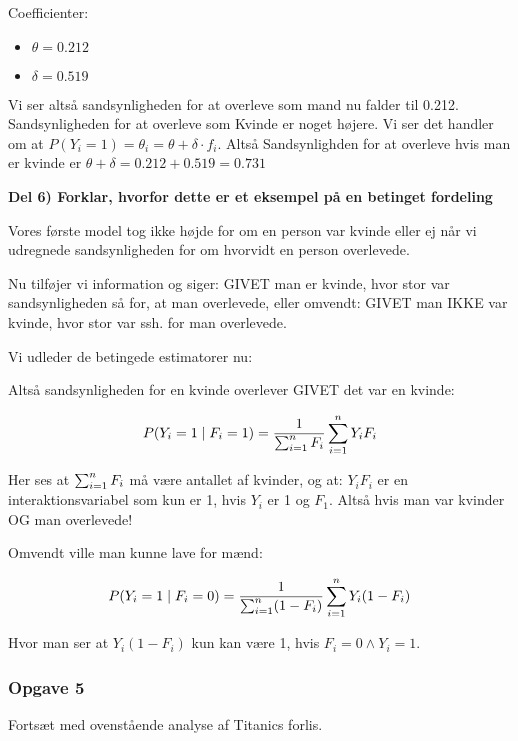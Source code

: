 Coefficienter:

\begin{itemize}
    \item $\theta = 0.212$
    \item $\delta = 0.519$
\end{itemize}

Vi ser altså sandsynligheden for at overleve som mand nu falder til 0.212. Sandsynligheden for at overleve som Kvinde er noget højere. Vi ser det handler om at $P(Y_i = 1) = \theta_i = \theta + \delta \cdot f_i$. Altså Sandsynlighden for at overleve hvis man er kvinde er $\theta + \delta = 0.212 + 0.519 = 0.731$

\textbf{Del 6) Forklar, hvorfor dette er et eksempel på en betinget fordeling}

Vores første model tog ikke højde for om en person var kvinde eller ej når vi udregnede sandsynligheden for om hvorvidt en person overlevede.

Nu tilføjer vi information og siger: GIVET man er kvinde, hvor stor var sandsynligheden så for, at man overlevede, eller omvendt: GIVET man IKKE var kvinde, hvor stor var ssh. for man overlevede.

Vi udleder de betingede estimatorer nu:

Altså sandsynligheden for en kvinde overlever GIVET det var en kvinde:

\begin{equation}
    P(Y_i = 1 \mid F_i = 1) = \frac{1}{\sum_{i=1}^{n} F_i} \sum_{i=1}^{n} Y_i F_i
\end{equation}

Her ses at $\sum_{i=1}^{n} F_i$ må være antallet af kvinder, og at: $Y_i F_i$ er en interaktionsvariabel som kun er 1, hvis $Y_i$ er 1 og $F_1$. Altså hvis man var kvinder OG man overlevede!

Omvendt ville man kunne lave for mænd:

\begin{equation}
    P(Y_i = 1 \mid F_i = 0) = \frac{1}{\sum_{i=1}^{n} (1 - F_i)} \sum_{i=1}^{n} Y_i (1 - F_i )
\end{equation}

Hvor man ser at $Y_i(1- F_i)$ kun kan være 1, hvis $F_i = 0 \land Y_i = 1$.


\subsubsection{Opgave 5}

Fortsæt med ovenstående analyse af Titanics forlis.

